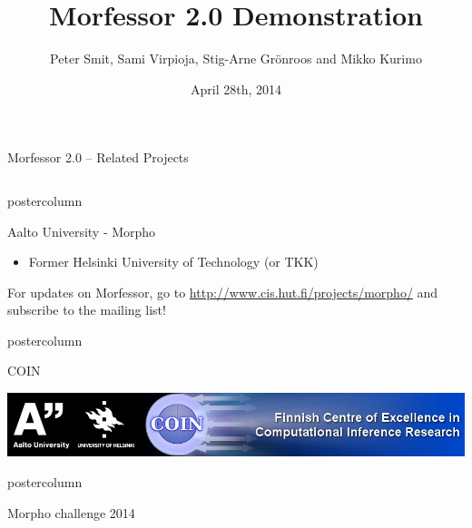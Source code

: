 \documentclass[final]{beamer} %
\title{Morfessor 2.0 Demonstration}
\author{Peter Smit, Sami Virpioja, Stig-Arne Gr\"onroos and Mikko Kurimo}
\institute[Aalto University]{Aalto University}
\date{April 28th, 2014}
\begin{document}
  \begin{frame}{Morfessor 2.0 -- Related Projects} 
\begin{columns}



\begin{column}{.49\textwidth}
  \begin{beamercolorbox}[center,wd=\textwidth]{postercolumn}
 \begin{block}{Aalto University  - Morpho}

              \begin{itemize}
              \item Former Helsinki University of Technology (or TKK)\\[1cm]

              \end{itemize}              

For updates on Morfessor, go to  \url{http://www.cis.hut.fi/projects/morpho/}  and subscribe to the mailing list!
            \end{block}
            
	\end{beamercolorbox}
\vfill

  \begin{beamercolorbox}[center,wd=\textwidth]{postercolumn}
 \begin{block}{COIN}
\vspace{1cm}

              \includegraphics[width=\textwidth]{coinbanner}            
            \end{block}
            
	\end{beamercolorbox}
\vfill
  \begin{beamercolorbox}[center,wd=\textwidth]{postercolumn}
 \begin{block}{Morpho challenge 2014}
            


\end{block}
\end{beamercolorbox}
\end{column}
\end{columns}
\end{frame}
\end{document}
